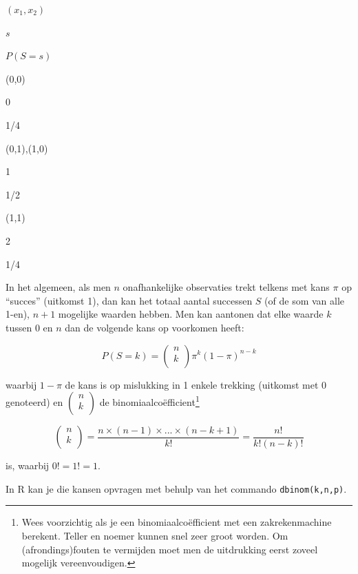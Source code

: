 \documentclass[
  12pt,dutch,coursenotes]{book}
\newcommand{\passthrough}[1]{#1}
\theoremstyle{definition}
\theoremstyle{definition}
\theoremstyle{definition}
\theoremstyle{definition}
\theoremstyle{remark}
\begin{document}
\((x_1,x_2)\)

\(s\)

\(P(S=s)\)

(0,0)

0

1/4

(0,1),(1,0)

1

1/2

(1,1)

2

1/4

In het algemeen, als men \(n\) onafhankelijke observaties trekt telkens met kans \(\pi\) op ``succes'' (uitkomst 1), dan kan het totaal aantal successen
\(S\) (of de som van alle 1-en), \(n+1\) mogelijke waarden hebben. Men kan
aantonen dat elke waarde \(k\) tussen 0 en \(n\) dan de volgende kans op
voorkomen heeft:

\begin{equation}
P(S=k) = \left (
\begin{array}{c}
n \\
k \\
\end{array}
\right ) \pi^k (1-\pi)^{n-k}  \label{eq:binomk}
\end{equation}

waarbij \(1-\pi\) de kans is op mislukking in 1 enkele trekking (uitkomst met 0 genoteerd) en
\(\left(\begin{array}{c} n \\ k \\ \end{array}\right)\) de binomiaalcoëfficient\footnote{Wees voorzichtig als je een binomiaalcoëfficient met een zakrekenmachine
  berekent. Teller en noemer kunnen snel zeer groot worden. Om (afrondings)fouten te vermijden moet men de uitdrukking eerst zoveel
  mogelijk vereenvoudigen.}

\begin{equation*}
\left (
\begin{array}{c}
n \\
k \\
\end{array}
\right ) = \frac{n \times (n-1) \times ...\times (n-k+1) }{ k!} = \frac{ n!}{ k!(n-k)! }
\end{equation*}

is, waarbij \(0!=1!=1\).

In R kan je die kansen opvragen met behulp van het commando \passthrough{\lstinline!dbinom(k,n,p)!}.
\end{document}
